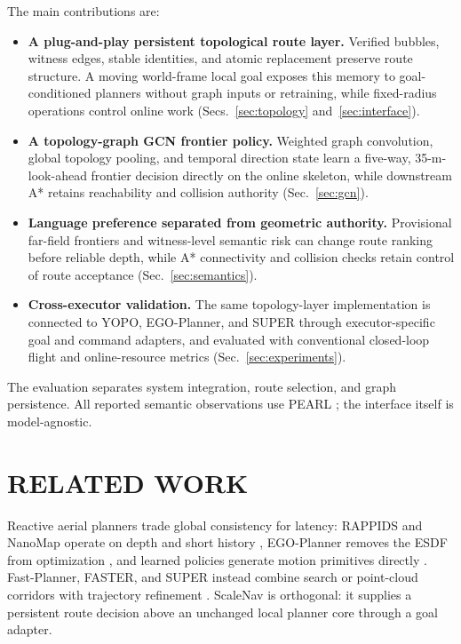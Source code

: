 \documentclass[letterpaper,10pt,conference]{ieeeconf}
\begin{document}
The main contributions are:
\begin{itemize}
  \setlength\itemsep{0pt}
  \item \textbf{A plug-and-play persistent topological route layer.}
  Verified bubbles, witness edges, stable identities, and atomic replacement
  preserve route structure.  A moving world-frame local goal exposes this
  memory to goal-conditioned planners without graph inputs or retraining,
  while fixed-radius operations control online work
  (Secs.~\ref{sec:topology} and~\ref{sec:interface}).
  \item \textbf{A topology-graph GCN frontier policy.}
  Weighted graph convolution, global topology pooling, and temporal direction
  state learn a five-way, 35-m-look-ahead frontier decision directly on the
  online skeleton, while downstream A* retains reachability and collision
  authority (Sec.~\ref{sec:gcn}).
  \item \textbf{Language preference separated from geometric authority.}
  Provisional far-field frontiers and witness-level semantic risk can change
  route ranking before reliable depth, while A* connectivity and collision
  checks retain control of route acceptance (Sec.~\ref{sec:semantics}).
  \item \textbf{Cross-executor validation.}
  The same topology-layer implementation is connected to YOPO, EGO-Planner,
  and SUPER through executor-specific goal and command adapters, and evaluated
  with conventional closed-loop flight and online-resource metrics
  (Sec.~\ref{sec:experiments}).
\end{itemize}

The evaluation separates system integration, route selection, and graph
persistence.  All reported semantic observations use PEARL \cite{pearl}; the
interface itself is model-agnostic.

\section{RELATED WORK}
Reactive aerial planners trade global consistency for latency: RAPPIDS and
NanoMap operate on depth and short history \cite{rappids,nanomap}, EGO-Planner
removes the ESDF from optimization \cite{egoplanner}, and learned policies
generate motion primitives directly \cite{yopo,loquercio}.  Fast-Planner,
FASTER, and SUPER instead combine search or point-cloud corridors with
trajectory refinement \cite{fastplanner,faster,super}.  ScaleNav is
orthogonal: it supplies a persistent route decision above an unchanged local
planner core through a goal adapter.
\end{document}
